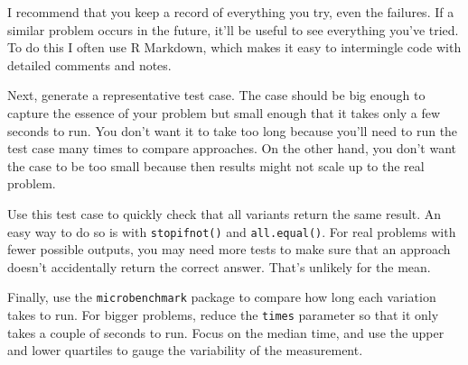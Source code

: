 \begin{Shaded}
\begin{Highlighting}[]
\StringTok{ }
\StringTok{ }\StringTok{ }
\end{Highlighting}
\end{Shaded}

I recommend that you keep a record of everything you try, even the
failures. If a similar problem occurs in the future, it'll be useful to
see everything you've tried. To do this I often use R Markdown, which
makes it easy to intermingle code with detailed comments and notes.

Next, generate a representative test case. The case should be big enough
to capture the essence of your problem but small enough that it takes
only a few seconds to run. You don't want it to take too long because
you'll need to run the test case many times to compare approaches. On
the other hand, you don't want the case to be too small because then
results might not scale up to the real problem.

Use this test case to quickly check that all variants return the same
result. An easy way to do so is with \texttt{stopifnot()} and
\texttt{all.equal()}. For real problems with fewer possible outputs, you
may need more tests to make sure that an approach doesn't accidentally
return the correct answer. That's unlikely for the mean.

\begin{Shaded}
\begin{Highlighting}[]
\StringTok{ }\NormalTok{(}\NormalTok{)}
\NormalTok{(}\NormalTok{(}
\end{Highlighting}
\end{Shaded}

Finally, use the \texttt{microbenchmark} package to compare how long
each variation takes to run. For bigger problems, reduce the
\texttt{times} parameter so that it only takes a couple of seconds to
run. Focus on the median time, and use the upper and lower quartiles to
gauge the variability of the measurement. 

\begin{Shaded}
\begin{Highlighting}[]
\NormalTok{(}
\NormalTok{)}
\end{Highlighting}
\end{Shaded}

